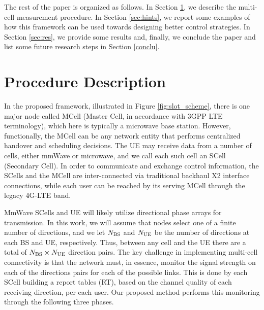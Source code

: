 \documentclass[conference,a4paper]{IEEEtran}
\begin{document}
The rest of the paper is organized as follows. In Section \ref{sec:MCP}, we describe the multi-cell measurement procedure. In Section \ref{sec:hints}, we report some examples of how this framework can be used towards designing better control strategies. In Section \ref{sec:res}, we provide some results and, finally,  we conclude the paper and list some future research steps in Section \ref{conclu}.










\section{Procedure Description}
\label{sec:MCP}



In the proposed framework, illustrated in Figure \ref{fig:slot_scheme}, there is one major node called MCell (Master Cell, in accordance with  3GPP LTE terminology), which here is typically
a microwave base station. However, functionally, the MCell can be any network entity
that performs centralized handover and scheduling decisions.  
The UE may receive data from a number of cells, either mmWave or microwave,
 and we call each such cell an SCell (Secondary Cell).
In order to communicate and exchange control information, the SCells and the MCell are inter-connected via traditional backhaul X2 interface connections, while each user can be reached by its serving MCell through the legacy 4G-LTE band.

MmWave SCells and UE will likely utilize directional phase arrays for transmission.
In this work, we will assume that nodes select one of a finite number of directions, 
and we let $N_{\rm BS}$ and $N_{\rm UE}$ be the number of directions at each BS 
and UE, respectively.  Thus, between any cell and the UE there are a total of 
$N_{\rm BS} \times N_{\rm UE}$ direction pairs.  The key challenge in implementing 
multi-cell connectivity is that the network must, in essence, monitor the signal strength 
on each of the directions pairs for each of the possible links. This is done by each SCell  building a report tables (RT), based on the channel quality of each receiving direction, per each user.  Our proposed method
performs this monitoring through the following three phases.
\end{document}
